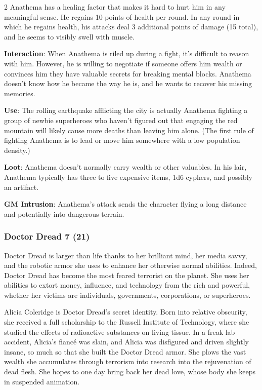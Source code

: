 \begin{multicols}{2}
Anathema has a healing factor that makes it hard to hurt him in any meaningful sense. He regains 10 points of health per round. In any round in which he regains health, his attacks deal 3 additional points of damage (15 total), and he seems to visibly swell with muscle.

\textbf{Interaction}: When Anathema is riled up during a fight, it’s difficult to reason with him. However, he is willing to negotiate if someone offers him wealth or convinces him they have valuable secrets for breaking mental blocks. Anathema doesn’t know how he became the way he is, and he wants to recover his missing memories.

\textbf{Use}: The rolling earthquake afflicting the city is actually Anathema fighting a group of newbie superheroes who haven’t figured out that engaging the red mountain will likely cause more deaths than leaving him alone. (The first rule of fighting Anathema is to lead or move him somewhere with a low population density.)

\textbf{Loot}: Anathema doesn’t normally carry wealth or other valuables. In his lair, Anathema typically has three to five expensive items, 1d6 cyphers, and possibly an artifact.

\textbf{GM Intrusion}: Anathema’s attack sends the character flying a long distance and potentially into dangerous terrain.

\subsubsection{Doctor Dread	7 (21)}

Doctor Dread is larger than life thanks to her brilliant mind, her media savvy, and the robotic armor she uses to enhance her otherwise normal abilities. Indeed, Doctor Dread has become the most feared terrorist on the planet. She uses her abilities to extort money, influence, and technology from the rich and powerful, whether her victims are individuals, governments, corporations, or superheroes.

Alicia Coleridge is Doctor Dread’s secret identity. Born into relative obscurity, she received a full scholarship to the Russell Institute of Technology, where she studied the effects of radioactive substances on living tissue. In a freak lab accident, Alicia’s fiancé was slain, and Alicia was disfigured and driven slightly insane, so much so that she built the Doctor Dread armor. She plows the vast wealth she accumulates through terrorism into research into the rejuvenation of dead flesh. She hopes to one day bring back her dead love, whose body she keeps in suspended animation.


\end{multicols}
